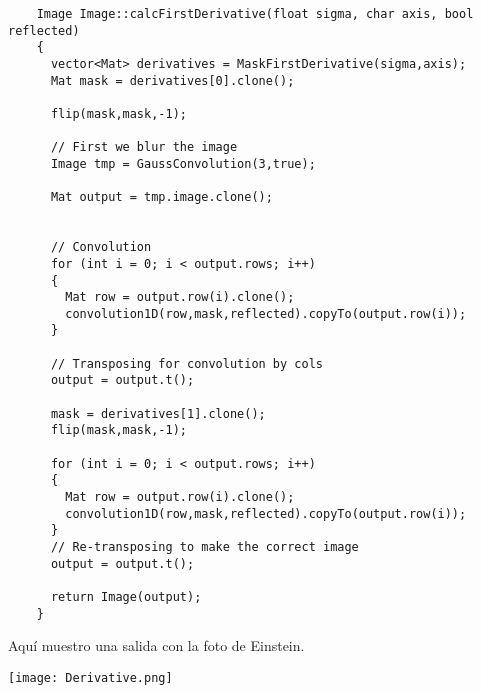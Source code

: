 \documentclass[a4paper, 11pt]{article}
\theoremstyle{definition}
\begin{document}
  \begin{lstlisting}
    Image Image::calcFirstDerivative(float sigma, char axis, bool reflected)
    {
      vector<Mat> derivatives = MaskFirstDerivative(sigma,axis);
      Mat mask = derivatives[0].clone();

      flip(mask,mask,-1);

      // First we blur the image
      Image tmp = GaussConvolution(3,true);

      Mat output = tmp.image.clone();


      // Convolution
      for (int i = 0; i < output.rows; i++)
      {
        Mat row = output.row(i).clone();
        convolution1D(row,mask,reflected).copyTo(output.row(i));
      }

      // Transposing for convolution by cols
      output = output.t();

      mask = derivatives[1].clone();
      flip(mask,mask,-1);

      for (int i = 0; i < output.rows; i++)
      {
        Mat row = output.row(i).clone();
        convolution1D(row,mask,reflected).copyTo(output.row(i));
      }
      // Re-transposing to make the correct image
      output = output.t();

      return Image(output);
    }
  \end{lstlisting}

  Aquí muestro una salida con la foto de Einstein.

  \centerline{\texttt{[image: Derivative.png]}}

  
\end{document}

